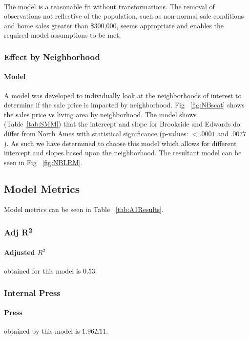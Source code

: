 \documentclass[11pt]{scrartcl} %
\begin{document}
\paragraph{}The model is a reasonable fit without transformations.  The removal of observations not reflective of the population, such as non-normal sale conditions and home sales greater than \$300,000, seems appropriate and enables the required model assumptions to be met.

\subsubsection{Effect by Neighborhood}
\paragraph{Model} A model was developed to individually look at the neighborhoods of interest to determine if the sale price is impacted by neighborhood. Fig ~\ref{fig:NBscat} shows the sales price vs living area by neighborhood. The model shows (Table~\ref{tab:SMM}) that the intercept and slope for Brookside and Edwards do differ from North Ames with statistical significance (p-values: $<.0001$ and $.0077$). As such we have determined to choose this model which allows for different intercept and slopes based upon the neighborhood. The resultant model can be seen in Fig ~\ref{fig:NBLRM}.


\subsection{Model Metrics}
Model metrics can be seen in Table ~\ref{tab:A1Results}.
\subsubsection{Adj R\textsuperscript{2}} 
\paragraph{Adjusted $R^2$} obtained for this model is 0.53.
\subsubsection{Internal Press} 
\paragraph{Press} obtained by this model is $1.96E11$.
\end{document}
